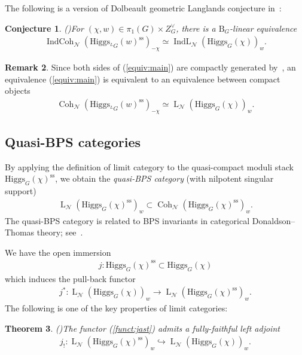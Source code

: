 \documentclass[11pt,oneside,a4paper,mathscr]{amsart}
\newtheorem{thm}{Theorem}[section]
\newtheorem{conj}[thm]{Conjecture}
\theoremstyle{definition}
\newtheorem{remark}[thm]{Remark}
\newcommand{\LL}{\operatorname{L}}
\newcommand{\rB}{\mathrm{B}}
\newcommand{\Coh}{\operatorname{Coh}}
\newcommand{\IndCoh}{\operatorname{IndCoh}}
\newcommand{\IndL}{\operatorname{IndL}}
\newcommand{\Hig}{\mathrm{Higgs}}
\begin{document}
The following is a version of Dolbeault geometric Langlands conjecture in~\cite{PTlim}:
\begin{conj}\emph{(\cite[Conjecture~1.1]{PTlim})}\label{conj:dl}
For $(\chi, w)\in \pi_1(G)\times Z_G^{\vee}$, there is a $\rB_G$-linear equivalence 
\begin{align}\label{equiv:main}
    \IndCoh_{\mathcal{N}}(\Hig_{^{L}G}(w)^{\mathrm{ss}})_{-\chi} \simeq \IndL_{\mathcal{N}}(\Hig_G(\chi))_w.
\end{align}
\end{conj}

\begin{remark}\label{rmk:compact}
Since both sides of (\ref{equiv:main}) are compactly generated by~\cite[Theorem~7.18 and 7.19]{PTlim}, 
    an equivalence (\ref{equiv:main}) is equivalent to an equivalence between 
    compact objects 
    \begin{align}\label{equiv:main2}
         \Coh_{\mathcal{N}}(\Hig_{^{L}G}(w)^{\mathrm{ss}})_{-\chi} \simeq \LL_{\mathcal{N}}(\Hig_G(\chi))_w.
    \end{align}
\end{remark}



\subsection{Quasi-BPS categories}
By applying the definition of limit category to the 
quasi-compact moduli stack $\Hig_G(\chi)^{\mathrm{ss}}$, we obtain 
the \textit{quasi-BPS category} (with nilpotent singular support)
\begin{align*}
    \LL_{\mathcal{N}}(\Hig_G(\chi)^{\mathrm{ss}})_w \subset \Coh_{\mathcal{N}}(\Hig_G(\chi)^{\mathrm{ss}})_w.
\end{align*}
The quasi-BPS category is related to BPS invariants in categorical
Donaldson--\allowbreak Thomas theory; see~\cite{PThiggs, PThiggs2, PTlim}. 

We have the open immersion 
\begin{align*}
    j\colon \Hig_G(\chi)^{\mathrm{ss}}\subset \Hig_G(\chi)
\end{align*}
which induces the pull-back functor 
\begin{align}\label{funct:jast}
j^* \colon \LL_{\mathcal{N}}(\Hig_G(\chi))_w\to \LL_{\mathcal{N}}(\Hig_G(\chi)^{\mathrm{ss}})_{w}.
\end{align}
The following is one of the key properties of limit categories:
\begin{thm}\emph{(\cite[Theorem~7.19]{PTlim})}\label{thm:left}
The functor (\ref{funct:jast}) admits a fully-faithful left adjoint 
\begin{align*}
    j_{!} \colon \LL_{\mathcal{N}}(\Hig_G(\chi)^{\mathrm{ss}})_w\hookrightarrow\LL_{\mathcal{N}}(\Hig_G(\chi))_w.
\end{align*}
    
\end{thm}
\end{document}
